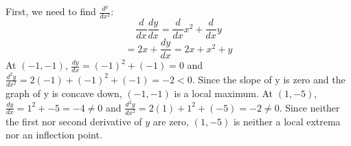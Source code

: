 \begin{Answer}[ref=implicit2]
	First, we need to find $\frac{d^y}{dx^2}$:
	$$\frac{d}{dx}\frac{dy}{dx} = \frac{d}{dx}x^2 + \frac{d}{dx}y$$
	$$= 2x + \frac{dy}{dx} = 2x + x^2 + y$$
	At $(-1,-1)$, $\frac{dy}{dx} = (-1)^2 + (-1) = 0$ and 
	$\frac{d^2y}{dx^2} = 2(-1) + (-1)^2 + (-1) = -2 < 0$. Since the 
	slope of y is zero and the graph of y is concave down, $(-1,-1)$ is a 
	local maximum. At $(1, -5)$, $\frac{dy}{dx} = 1^2 + -5 = -4 \neq 0$ 
	and $\frac{d^2y}{dx^2} = 2(1) + 1^2 + (-5) = -2 \neq 0$. Since 
	neither the first nor second derivative of $y$ are zero, $(1, -5)$ 
	is neither a local extrema nor an inflection point. 
\end{Answer}






 
 
 
 
 
 
 
 